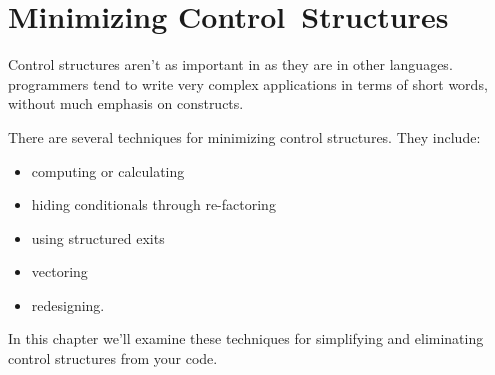 

\chapter{Minimizing Control~Structures}%
%

\initial Control structures aren't as important in \Forth{} as they
are in other languages. \Forth{} programmers tend to write very
complex applications in terms of short words, without much emphasis on
 constructs.

There are several techniques for minimizing control structures.
They include:

\begin{itemize}
\item computing or calculating
\item hiding conditionals through re-factoring
\item using structured exits
\item vectoring
\item redesigning.
\end{itemize}
In this chapter we'll examine these techniques for simplifying and
eliminating control structures from your code.

